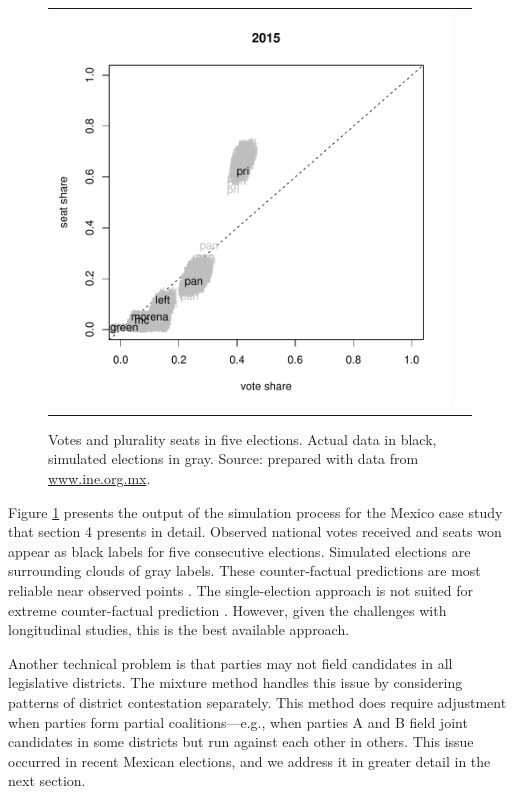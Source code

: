 \documentclass[letter,12pt]{article}
\begin{document}
\begin{figure}
\begin{center}
\begin{tabular}{cc}
    \includegraphics[width=.4\columnwidth]{vs2015.pdf} & \\
\end{tabular}
\caption{Votes and plurality seats in five elections. Actual data in black, simulated elections in gray. Source: prepared with data from \url{www.ine.org.mx}.}\label{F:singleYrSeatsVotes}
\end{center}
\end{figure}

Figure \ref{F:singleYrSeatsVotes} presents the output of the simulation process for the Mexico case study that section 4 presents in detail. Observed national votes received and seats won appear as black labels for five consecutive elections. Simulated elections are surrounding clouds of gray labels. These counter-factual predictions are most reliable near observed points \citep[about $\pm5$ percent,][:fn.\ 8]{linzerSeatVoteElasticity2012}. The single-election approach is not suited for extreme counter-factual prediction \citep[something generally true for any approach,][]{gelman.king.1994EvalElSysRedis}. However, given the challenges with longitudinal studies, this is the best available approach.


Another technical problem is that parties may not field candidates in all legislative districts. The mixture method handles this issue by considering patterns of district contestation separately. This method does require adjustment when parties form partial coalitions---e.g., when parties A and B field joint candidates in some districts but run against each other in others. This issue occurred in recent Mexican elections, and we address it in greater detail in the next section. 
\end{document}
